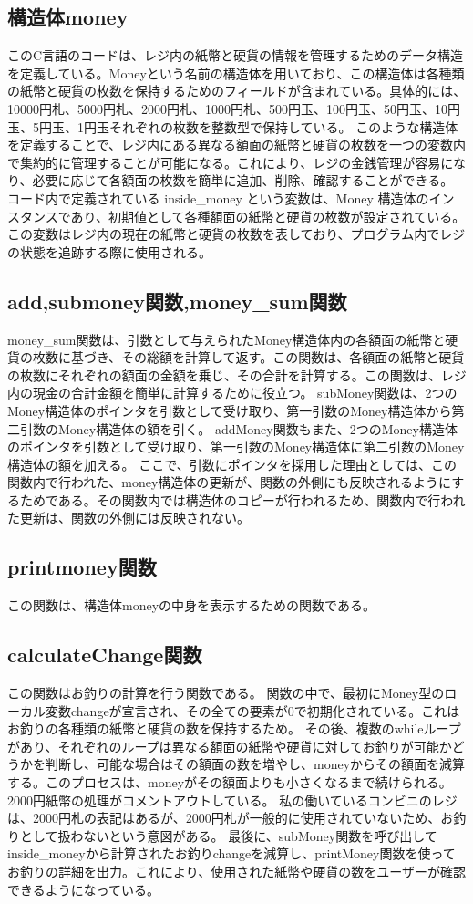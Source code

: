 \documentclass[a4j,11pt]{jarticle}
\begin{document}
\subsection{構造体money}
このC言語のコードは、レジ内の紙幣と硬貨の情報を管理するためのデータ構造を定義している。Moneyという名前の構造体を用いており、この構造体は各種類の紙幣と硬貨の枚数を保持するためのフィールドが含まれている。具体的には、10000円札、5000円札、2000円札、1000円札、500円玉、100円玉、50円玉、10円玉、5円玉、1円玉それぞれの枚数を整数型で保持している。
このような構造体を定義することで、レジ内にある異なる額面の紙幣と硬貨の枚数を一つの変数内で集約的に管理することが可能になる。これにより、レジの金銭管理が容易になり、必要に応じて各額面の枚数を簡単に追加、削除、確認することができる。
コード内で定義されている inside\_money という変数は、Money 構造体のインスタンスであり、初期値として各種額面の紙幣と硬貨の枚数が設定されている。この変数はレジ内の現在の紙幣と硬貨の枚数を表しており、プログラム内でレジの状態を追跡する際に使用される。
\subsection{add,submoney関数,money\_sum関数}
money\_sum関数は、引数として与えられたMoney構造体内の各額面の紙幣と硬貨の枚数に基づき、その総額を計算して返す。この関数は、各額面の紙幣と硬貨の枚数にそれぞれの額面の金額を乗じ、その合計を計算する。この関数は、レジ内の現金の合計金額を簡単に計算するために役立つ。
subMoney関数は、2つのMoney構造体のポインタを引数として受け取り、第一引数のMoney構造体から第二引数のMoney構造体の額を引く。
addMoney関数もまた、2つのMoney構造体のポインタを引数として受け取り、第一引数のMoney構造体に第二引数のMoney構造体の額を加える。
ここで、引数にポインタを採用した理由としては、この関数内で行われた、money構造体の更新が、関数の外側にも反映されるようにするためである。その関数内では構造体のコピーが行われるため、関数内で行われた更新は、関数の外側には反映されない。
\subsection{printmoney関数}
この関数は、構造体moneyの中身を表示するための関数である。
\subsection{calculateChange関数}
この関数はお釣りの計算を行う関数である。
関数の中で、最初にMoney型のローカル変数changeが宣言され、その全ての要素が0で初期化されている。これはお釣りの各種類の紙幣と硬貨の数を保持するため。
その後、複数のwhileループがあり、それぞれのループは異なる額面の紙幣や硬貨に対してお釣りが可能かどうかを判断し、可能な場合はその額面の数を増やし、moneyからその額面を減算する。このプロセスは、moneyがその額面よりも小さくなるまで続けられる。
2000円紙幣の処理がコメントアウトしている。
私の働いているコンビニのレジは、2000円札の表記はあるが、2000円札が一般的に使用されていないため、お釣りとして扱わないという意図がある。
最後に、subMoney関数を呼び出してinside\_moneyから計算されたお釣りchangeを減算し、printMoney関数を使ってお釣りの詳細を出力。これにより、使用された紙幣や硬貨の数をユーザーが確認できるようになっている。
\end{document}
